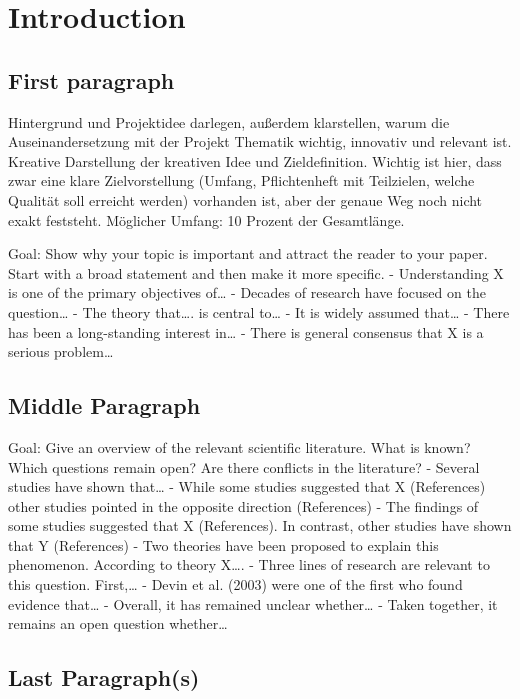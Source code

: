 \chapter{Introduction}

\section{First paragraph}
\label{first-paragraph}

Hintergrund und Projektidee darlegen, außerdem klarstellen, warum die Auseinandersetzung mit der Projekt Thematik wichtig, innovativ und relevant ist. Kreative Darstellung der kreativen Idee und Zieldefinition. Wichtig ist hier, dass zwar eine klare Zielvorstellung (Umfang, Pflichtenheft mit Teilzielen, welche Qualität soll erreicht werden) vorhanden ist, aber der genaue Weg noch nicht exakt feststeht. Möglicher Umfang: 10 Prozent der Gesamtlänge.

Goal: Show why your topic is important and attract the reader to your paper. Start with a broad statement and then make it more specific.
- Understanding X is one of the primary objectives of…
- Decades of research have focused on the question…
- The theory that…. is central to…
- It is widely assumed that…
- There has been a long-standing interest in…
- There is general consensus that X is a serious problem…

\section{Middle Paragraph}
\label{middle-paragraph}

Goal: Give an overview of the relevant scientific literature.
What is known? Which questions remain open? Are there conflicts in the literature?
- Several studies have shown that…
- While some studies suggested that X (References) other studies pointed in the opposite
direction (References)
- The findings of some studies suggested that X (References). In contrast, other studies have shown that Y (References)
- Two theories have been proposed to explain this phenomenon. According to theory X….
- Three lines of research are relevant to this question. First,…
- Devin et al. (2003) were one of the first who found evidence that…
- Overall, it has remained unclear whether…
- Taken together, it remains an open question whether…

\section{Last Paragraph(s)}
\label{last-paragraphs}


